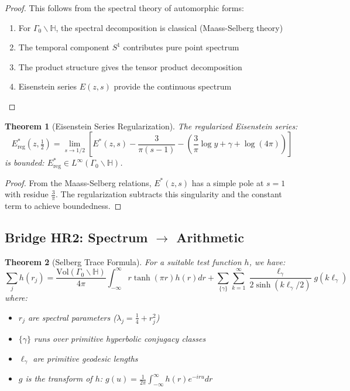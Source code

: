 \documentclass[11pt]{article}
\theoremstyle{plain}
\newtheorem{theorem}{Theorem}[section]
\theoremstyle{remark}
\newcommand{\H}{\mathbb{H}}
\newcommand{\Vol}{\text{Vol}}
\newcommand{\EisReg}{E^*_{\text{reg}}}
\begin{document}
\begin{proof}
This follows from the spectral theory of automorphic forms:
\begin{enumerate}
\item For $\Gamma_0 \backslash \H$, the spectral decomposition is classical (Maass-Selberg theory)
\item The temporal component $S^1$ contributes pure point spectrum
\item The product structure gives the tensor product decomposition
\item Eisenstein series $E(z,s)$ provide the continuous spectrum
\end{enumerate}
\end{proof}

\begin{theorem}[Eisenstein Series Regularization]
The regularized Eisenstein series:
\[
\EisReg(z,\tfrac{1}{2}) = \lim_{s \to 1/2} \left[E^*(z,s) - \frac{3}{\pi(s-1)} - \left(\frac{3}{\pi} \log y + \gamma + \log(4\pi)\right)\right]
\]
is bounded: $\EisReg \in L^\infty(\Gamma_0 \backslash \H)$.
\end{theorem}

\begin{proof}
From the Maass-Selberg relations, $E^*(z,s)$ has a simple pole at $s=1$ with residue $\frac{3}{\pi}$. The regularization subtracts this singularity and the constant term to achieve boundedness.
\end{proof}

\subsection{Bridge HR2: Spectrum $\rightarrow$ Arithmetic}

\begin{theorem}[Selberg Trace Formula]
For a suitable test function $h$, we have:
\[
\sum_j h(r_j) = \frac{\Vol(\Gamma_0 \backslash \H)}{4\pi} \int_{-\infty}^\infty r \tanh(\pi r) h(r)  dr + \sum_{\{\gamma\}} \sum_{k=1}^\infty \frac{\ell_\gamma}{2\sinh(k\ell_\gamma/2)} g(k\ell_\gamma)
\]
where:
\begin{itemize}
\item $r_j$ are spectral parameters ($\lambda_j = \tfrac{1}{4} + r_j^2$)
\item $\{\gamma\}$ runs over primitive hyperbolic conjugacy classes
\item $\ell_\gamma$ are primitive geodesic lengths
\item $g$ is the transform of $h$: $g(u) = \frac{1}{2\pi} \int_{-\infty}^\infty h(r) e^{-iru}  dr$
\end{itemize}
\end{theorem}
\end{document}
